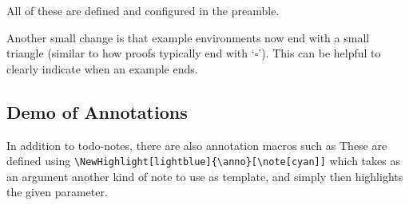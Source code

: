 \documentclass[
11pt,              %
english,           %
doublespacing,     %
liststotoc,        %
headsepline,       %
]{MastersDoctoralThesis} %
\begin{document}
\begin{infobox}
All of these are defined and configured in the preamble. 
\end{infobox}



\begin{exa}[Triangle]
    Another small change is that example environments now end with a small triangle (similar to how proofs typically end with `$\square$'). This can be helpful to clearly indicate when an example ends.
\end{exa}


\subsection{Demo of Annotations}

In addition to todo-notes, there are also annotation macros such as  
These are defined using \verb|\NewHighlight[lightblue]{\anno}[\note[cyan]]| which takes as an argument another kind of note to use as template, and simply then highlights the given parameter. 

% 
% 
% 
% 
% 
% 




\appendix %



% 


\cleardoublepage



\printglossary[type=abbreviations,nonumberlist]



\cleardoublepage


\printbibliography[heading=bibintoc]

\end{document}
